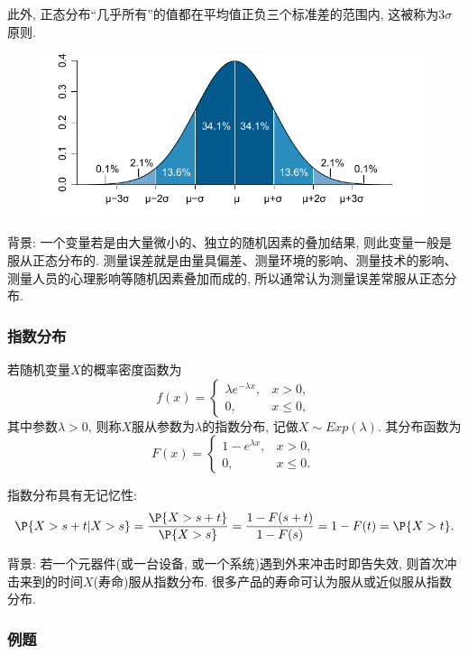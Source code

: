 \documentclass[11pt]{ctexart}
\begin{document}
此外, 正态分布“几乎所有”的值都在平均值正负三个标准差的范围内, 这被称为{\keben $3\sigma$原则}. 
\begin{figure}[H]
	\centering
	\includegraphics[width = .7 \textwidth]{figure/Standard_deviation_diagram_micro.pdf}
\end{figure}

背景: 一个变量若是由大量微小的、独立的随机因素的叠加结果, 则此变量一般是服从正态分布的. 
测量误差就是由量具偏差、测量环境的影响、测量技术的影响、测量人员的心理影响等随机因素叠加而成的, 所以通常认为测量误差常服从正态分布. 

\subsubsection{指数分布}

若随机变量$X$的概率密度函数为
\begin{equation*}
	f(x) = 
		\begin{cases}
			\lambda e^{-\lambda x}, & x > 0, \\
			0, & x\leq 0, 
		\end{cases}
\end{equation*}
其中参数$\lambda > 0$, 则称$X$服从参数为$\lambda$的指数分布, 记做$X \sim Exp(\lambda)$. 
其分布函数为
\begin{equation*}
	F(x) = 
		\begin{cases}
			1 - e^{\lambda x}, & x > 0, \\
			0, & x \leq 0. 
		\end{cases}
\end{equation*}

指数分布具有{\keben 无记忆性}: 
\begin{equation*}
	\P\{ X > s + t | X > s\}
	= \frac{\P\{ X > s+t \}}{\P\{ X > s \}}
	= \frac{1 - F(s+t)}{1 - F(s)} 
	= 1 - F(t)
	= \P\{X > t\}. 
\end{equation*}

背景: 若一个元器件(或一台设备, 或一个系统)遇到外来冲击时即告失效, 则首次冲击来到的时间$X$(寿命)服从指数分布. 
很多产品的寿命可认为服从或近似服从指数分布. 

\subsubsection{例题}
\end{document}
